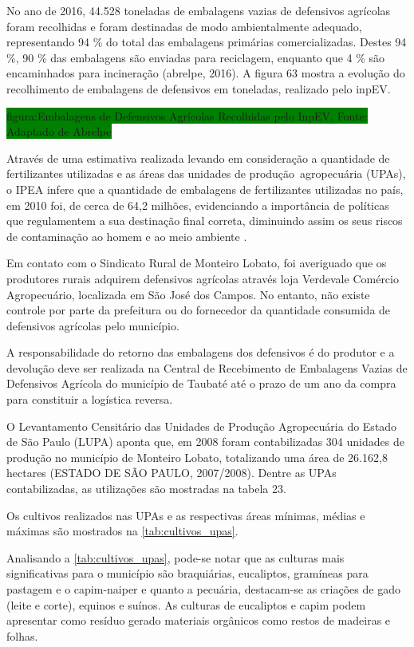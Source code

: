 	No ano de 2016, 44.528 toneladas de embalagens vazias de defensivos agrícolas foram recolhidas e foram destinadas de modo ambientalmente adequado, representando 94 \% do total das embalagens primárias comercializadas. Destes 94 \%, 90 \% das embalagens são enviadas para reciclagem, enquanto que 4 \% são encaminhados para incineração (\gls{abrelpe}, 2016). A figura 63 mostra a evolução do recolhimento de embalagens de defensivos em toneladas, realizado pelo inpEV.
	
	\colorbox{green}{figura:Embalagens de Defensivos Agrícolas Recolhidas pelo InpEV. Fonte: Adaptado de Abrelpe}
	
	Através de uma estimativa realizada levando em consideração a quantidade de fertilizantes utilizadas e as áreas das unidades de produção agropecuária (UPAs), o IPEA infere que a quantidade de embalagens de fertilizantes utilizadas no país, em 2010 foi, de cerca de 64,2 milhões, evidenciando a importância de políticas que regulamentem a sua destinação final correta, diminuindo assim os seus riscos de contaminação ao homem e ao meio ambiente \cite{IPEA2013}.
	
	Em contato com o Sindicato Rural de Monteiro Lobato, foi averiguado que os produtores rurais adquirem defensivos agrícolas através loja Verdevale Comércio Agropecuário, localizada em São José dos Campos. No entanto, não existe controle por parte da prefeitura ou do fornecedor da quantidade consumida de defensivos agrícolas pelo município. 
	
	A responsabilidade do retorno das embalagens dos defensivos é do produtor e a devolução deve ser realizada na Central de Recebimento de Embalagens Vazias de Defensivos Agrícola do município de Taubaté até o prazo de um ano da compra para constituir a logística reversa.
	
	O Levantamento Censitário das Unidades de Produção Agropecuária do Estado de São Paulo (LUPA) aponta que, em 2008 foram contabilizadas 304 unidades de produção no município de Monteiro Lobato, totalizando uma área de 26.162,8 hectares (ESTADO DE SÃO PAULO, 2007/2008). Dentre as UPAs contabilizadas, as utilizações são mostradas na tabela 23.
	
	

	Os cultivos realizados nas UPAs e as respectivas áreas mínimas, médias e máximas são mostrados na \autoref{tab:cultivos_upas}.
	
	
	
	Analisando a \autoref{tab:cultivos_upas}, pode-se notar que as culturas mais significativas para o município são braquiárias, eucaliptos, gramíneas para pastagem e o capim-naiper e quanto a pecuária, destacam-se as criações de gado (leite e corte), equinos e suínos. As culturas de eucaliptos e capim podem apresentar como resíduo gerado materiais orgânicos como restos de madeiras e folhas.
	
